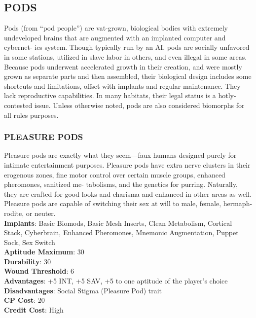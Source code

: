 \subsection{PODS}
Pods (from “pod people”) are vat-grown, biological
bodies with extremely undeveloped brains that are
augmented with an implanted computer and cybernet-
ics system. Though typically run by an AI, pods are
socially unfavored in some stations, utilized in slave
labor in others, and even illegal in some areas. Because
pods underwent accelerated growth in their creation,
and were mostly grown as separate parts and then
assembled, their biological
design includes some shortcuts
and limitations, offset with implants
and regular maintenance. They lack
reproductive capabilities. In many habitats,
their legal status is a hotly-contested issue.
Unless otherwise noted, pods are also considered biomorphs for all rules purposes.

\subsubsection{PLEASURE PODS}
Pleasure pods are exactly what they seem—faux
humans designed purely for intimate entertainment
purposes. Pleasure pods have extra nerve clusters in
their erogenous zones, fine motor control over certain
muscle groups, enhanced pheromones, sanitized me-
tabolisms, and the genetics for purring. Naturally, they
are crafted for good looks and charisma and enhanced
in other areas as well. Pleasure pods are capable of
switching their sex at will to male, female, hermaph-
rodite, or neuter.
\\ \textbf{Implants}: Basic Biomods, Basic Mesh Inserts, Clean
Metabolism, Cortical Stack, Cyberbrain, Enhanced
Pheromones, Mnemonic Augmentation, Puppet
Sock, Sex Switch
\\ \textbf{Aptitude Maximum}: 30
\\ \textbf{Durability}: 30
\\ \textbf{Wound Threshold}: 6
\\ \textbf{Advantages}: +5 INT, +5 SAV, +5 to one aptitude of the
player’s choice
\\ \textbf{Disadvantages}: Social Stigma (Pleasure Pod) trait
\\ \textbf{CP Cost}: 20
\\ \textbf{Credit Cost}: High

